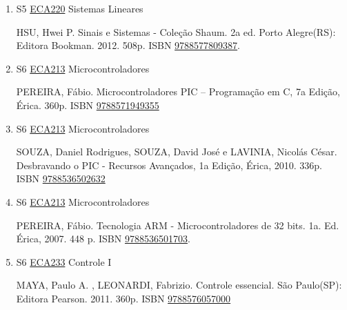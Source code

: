 \documentclass[12pt,a4paper]{book}
\begin{document}
\begin{enumerate}
 LATHI, B.  P.  Sinais e Sistemas Lineares.  2a ed.  Porto Alegre (RS): Bookman, 2008.  856p.  ISBN \href{http://www.bn.br/site/pages/servicosProfissionais/agenciaISBN/isbnBusca/FbnBuscaISBNCatalogo.asp?pField=ISBN&pIntPagina=1&pISBN=60031139&nidbISBN=true&hidbISBN=true}{9788560031139}
 
 
 \item S5 \hyperref[PUD:ECA220]{ECA220} Sistemas Lineares

 HSU, Hwei P.  Sinais e Sistemas - Coleção Shaum.  2a ed.  Porto Alegre(RS): Editora Bookman.  2012.  508p.  ISBN \href{http://www.bn.br/site/pages/servicosProfissionais/agenciaISBN/isbnBusca/FbnBuscaISBNCatalogo.asp?pField=ISBN&pIntPagina=1&pISBN=77809387&nidbISBN=true&hidbISBN=true}{9788577809387}.
 \item S6 \hyperref[PUD:ECA213]{ECA213} Microcontroladores

  PEREIRA, Fábio.  Microcontroladores PIC – Programação em C, 7a Edição, Érica.  360p.  ISBN \href{http://www.bn.br/site/pages/servicosProfissionais/agenciaISBN/isbnBusca/FbnBuscaISBNCatalogo.asp?pField=ISBN&pIntPagina=1&pISBN=71949355&nidbISBN=true&hidbISBN=true}{9788571949355}
 
 
 \item S6 \hyperref[PUD:ECA213]{ECA213} Microcontroladores

  SOUZA, Daniel Rodrigues, SOUZA, David José  e LAVINIA, Nicolás César.  Desbravando o PIC - Recursos Avançados, 1a Edição, Érica, 2010.  336p.  ISBN \href{http://www.bn.br/site/pages/servicosProfissionais/agenciaISBN/isbnBusca/FbnBuscaISBNCatalogo.asp?pField=ISBN&pIntPagina=1&pISBN=36502632&nidbISBN=true&hidbISBN=true}{9788536502632}
 
 
 \item S6 \hyperref[PUD:ECA213]{ECA213} Microcontroladores

  PEREIRA, Fábio.  Tecnologia ARM - Microcontroladores de 32 bits.  1a.  Ed.  Érica, 2007.  448 p.  ISBN \href{http://www.bn.br/site/pages/servicosProfissionais/agenciaISBN/isbnBusca/FbnBuscaISBNCatalogo.asp?pField=ISBN&pIntPagina=1&pISBN=36501703&nidbISBN=true&hidbISBN=true}{9788536501703}.
 \item S6 \hyperref[PUD:ECA233]{ECA233} Controle I

 MAYA, Paulo A. , LEONARDI, Fabrizio.  Controle essencial.  São Paulo(SP): Editora Pearson.  2011.  360p.  ISBN \href{http://www.bn.br/site/pages/servicosProfissionais/agenciaISBN/isbnBusca/FbnBuscaISBNCatalogo.asp?pField=ISBN&pIntPagina=1&pISBN=76057000&nidbISBN=true&hidbISBN=true}{9788576057000}
 

\end{enumerate}
\end{document}
